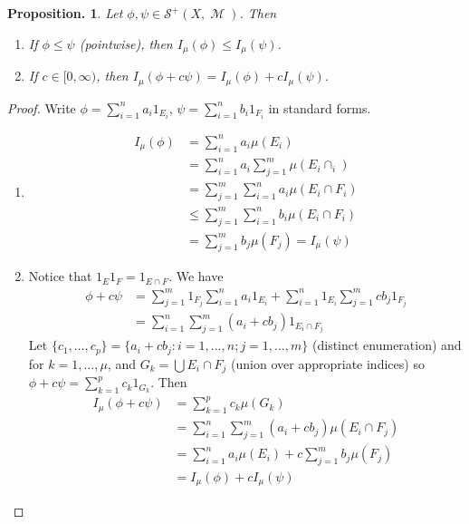 \documentclass[11pt, a4paper]{memoir}
\theoremstyle{change}
\newtheorem{proposition}[theorem]{Proposition.}
\theoremstyle{plain}
\theoremstyle{nonumberplain}
\newtheorem{proof}{Proof}
\DeclareMathOperator{\M}{{\mathcal{M}}}
\numberwithin{equation}{section}
\begin{document}
\begin{proposition}
    Let $\phi,\psi\in\mathcal{S}^+(X,\M)$.
    Then
    \begin{enumerate}[nolistsep,label=(\roman*)]
        \item If $\phi\leq\psi$ (pointwise), then $I_\mu(\phi)\leq I_\mu(\psi)$.
        \item If $c\in[0,\infty)$, then $I_\mu(\phi+c\psi)=I_\mu(\phi)+cI_\mu(\psi)$.
    \end{enumerate}
\end{proposition}
\begin{proof}
    Write $\phi=\sum_{i=1}^n a_i1_{E_i}$, $\psi=\sum_{i=1}^n b_i1_{F_i}$ in standard forms.
    \begin{enumerate}[nolistsep,label=(\roman*)]
        \item
            \begin{align*}
                I_\mu(\phi) &= \sum\limits_{i=1}^na_i\mu(E_i)\\
                            &=\sum\limits_{i=1}^n a_i\sum\limits_{j=1}^m \mu(E_i\cap _i)\\
                            &=\sum\limits_{j=1}^m\sum\limits_{i=1}^na_i\mu(E_i\cap F_i)\\
                            &\leq \sum\limits_{j=1}^m\sum\limits_{i=1}^n b_i\mu(E_i\cap F_i)\\
                            &= \sum\limits_{j=1}^m b_j\mu(F_j)=I_\mu(\psi)
            \end{align*}
        \item Notice that $1_E1_F=1_{E\cap F}$.
            We have
            \begin{align*}
                \phi+c\psi&=\sum\limits_{j=1}^m 1_{F_j}\sum\limits_{i=1}^n a_i1_{E_i}+\sum\limits_{i=1}^n 1_{E_i}\sum\limits_{j=1}^m cb_j1_{F_j}\\
                          &=\sum\limits_{i=1}^n\sum\limits_{j=1}^m(a_i+cb_j)1_{E_i\cap F_j}
            \end{align*}
            Let $\{c_1,\ldots,c_p\}=\{a_i+cb_j:i=1,\ldots,n;j=1,\ldots,m\}$ (distinct enumeration) and for $k=1,\ldots,\mu$, and $G_k=\bigcup E_i\cap F_j$ (union over appropriate indices) so $\phi+c\psi=\sum_{k=1}^p c_k 1_{G_k}$.
            Then
            \begin{align*}
                I_\mu(\phi+c\psi)&=\sum\limits_{k=1}^p c_k\mu(G_k)\\
                                 &=\sum\limits_{i=1}^n\sum\limits_{j=1}^m (a_i+cb_j)\mu(E_i\cap F_j)\\
                                 &= \sum\limits_{i=1}^n a_i\mu(E_i)+c\sum\limits_{j=1}^m b_j\mu(F_j)\\
                                 &= I_\mu(\phi)+cI_\mu(\psi)
            \end{align*}
    \end{enumerate}
\end{proof}
\end{document}
